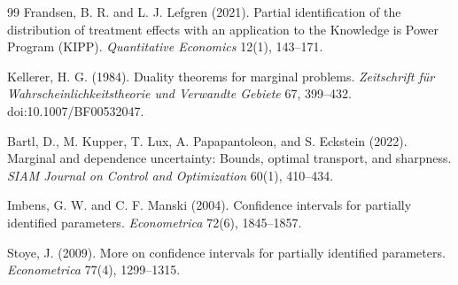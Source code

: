 \documentclass[11pt]{article}
\theoremstyle{definition}
\theoremstyle{plain}
\theoremstyle{remark}
\begin{document}
\begin{thebibliography}{99}
Frandsen, B. R. and L. J. Lefgren (2021).
\newblock Partial identification of the distribution of treatment effects with an application to the Knowledge is Power Program (KIPP).
\newblock \emph{Quantitative Economics} 12(1), 143--171.

Kellerer, H. G. (1984).
\newblock Duality theorems for marginal problems.
\newblock \emph{Zeitschrift f{\"u}r Wahrscheinlichkeitstheorie und Verwandte Gebiete} 67, 399--432.
\newblock doi:10.1007/BF00532047.

Bartl, D., M. Kupper, T. Lux, A. Papapantoleon, and S. Eckstein (2022).
\newblock Marginal and dependence uncertainty: Bounds, optimal transport, and sharpness.
\newblock \emph{SIAM Journal on Control and Optimization} 60(1), 410--434.

Imbens, G. W. and C. F. Manski (2004).
\newblock Confidence intervals for partially identified parameters.
\newblock \emph{Econometrica} 72(6), 1845--1857.

Stoye, J. (2009).
\newblock More on confidence intervals for partially identified parameters.
\newblock \emph{Econometrica} 77(4), 1299--1315.
\end{thebibliography}
\end{document}
